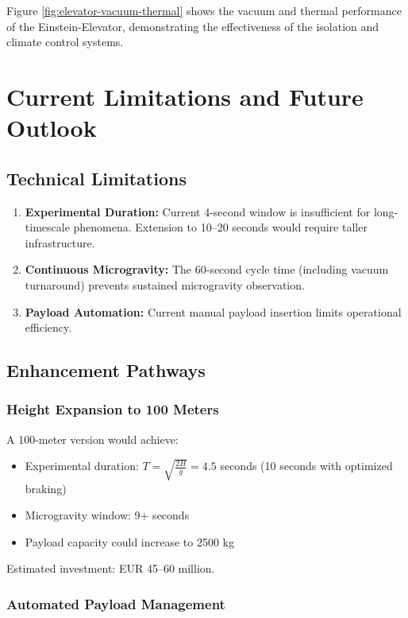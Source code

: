 ﻿\documentclass[a4paper,12pt]{article}
\theoremstyle{definition}
\begin{document}
Figure \ref{fig:elevator-vacuum-thermal} shows the vacuum and thermal performance of the Einstein-Elevator, demonstrating the effectiveness of the isolation and climate control systems.	

\section{Current Limitations and Future Outlook}

\subsection{Technical Limitations}

\begin{enumerate}
	\item \textbf{Experimental Duration:} Current 4-second window is insufficient for long-timescale phenomena. Extension to 10--20 seconds would require taller infrastructure.
	\item \textbf{Continuous Microgravity:} The 60-second cycle time (including vacuum turnaround) prevents sustained microgravity observation.
	\item \textbf{Payload Automation:} Current manual payload insertion limits operational efficiency.
\end{enumerate}

\subsection{Enhancement Pathways}

\subsubsection{Height Expansion to 100 Meters}

A 100-meter version would achieve:
\begin{itemize}
	\item Experimental duration: $T = \sqrt{\frac{2H}{g}} = 4.5$ seconds (10 seconds with optimized braking)
	\item Microgravity window: 9+ seconds
	\item Payload capacity could increase to 2500 kg
\end{itemize}

Estimated investment: EUR 45--60 million.

\subsubsection{Automated Payload Management}
\end{document}
